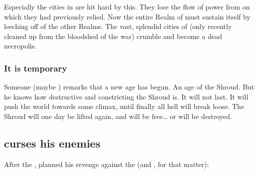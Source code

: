 Especially the \resphan{} cities in \Nyx{} are hit hard by this. 
They lose the flow of \bane{} power from \Erebos{} on which they had previously relied. 
Now the entire Realm of \Nyx{} must sustain itself by leeching off of the other \Miithian{} Realms. 
The vast, splendid cities of \Nyx{} (only recently cleaned up from the bloodshed of the \Merkyran{} war) crumble and become a dead necropolis. 







\subsubsection{It is temporary}
Someone (maybe \Ishnaruchaefir) remarks that a new age has begun.
An age of the Shroud. 
But he knows how destructive and constricting the Shroud is.
It will not last. 
It will push the world towards some climax, until finally all hell will break loose. 
The Shroud will one day be lifted again, and \Miith will be free\ldots{} or \Miith will be destroyed. 









\subsection{\Secherdamon curses his enemies}
After the \secondbanewar, \Secherdamon planned his revenge against the \resphain (and \Ishnaruchaefir, for that matter):

